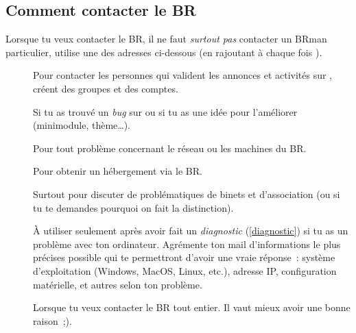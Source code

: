 \subsection{Comment contacter le BR}

Lorsque tu veux contacter le BR, il ne faut \emph{surtout pas} contacter un BRman particulier, utilise une des adresses ci-dessous (en rajoutant à chaque fois ).

\begin{description}

\item[] Pour contacter les personnes qui valident les annonces et activités sur \fkz, créent des groupes et des comptes.

\item[] Si tu as trouvé un \emph{bug} sur \fkz ou si tu as une idée pour l'améliorer (minimodule, thème\dots).

\item[] Pour tout problème concernant le réseau ou les machines du BR.

\item[] Pour obtenir un hébergement via le BR.



\item[] Surtout pour discuter de problématiques de binets et d'association (ou si tu te demandes pourquoi on fait la distinction).


\item[] À utiliser seulement après avoir fait un \emph{diagnostic} (\ref{diagnostic}) si tu as un problème avec ton ordinateur. Agrémente ton mail d'informations le plus précises possible qui te permettront d'avoir une vraie réponse~: système d'exploitation (Windows, MacOS, Linux, etc.), adresse IP, configuration matérielle, et autres selon ton problème.


\item[] Lorsque tu veux contacter le BR tout entier. Il vaut mieux avoir une bonne raison~;).

\end{description}
